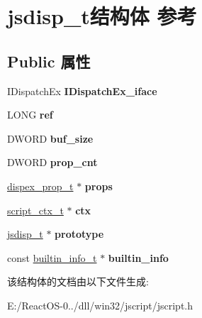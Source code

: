 \hypertarget{structjsdisp__t}{}\section{jsdisp\+\_\+t结构体 参考}
\label{structjsdisp__t}
\subsection*{Public 属性}
\begin{DoxyCompactItemize}
\item 
\mbox{\label{structjsdisp__t_a00bd6aeaaabfe1856165d92e302b3e56}} 
I\+Dispatch\+Ex {\bfseries I\+Dispatch\+Ex\+\_\+iface}
\item 
\mbox{\label{structjsdisp__t_a834448f9325aca6fa07a2470d3f0f55d}} 
L\+O\+NG {\bfseries ref}
\item 
\mbox{\label{structjsdisp__t_a6088d6e635771093b8204148f567b20c}} 
D\+W\+O\+RD {\bfseries buf\+\_\+size}
\item 
\mbox{\label{structjsdisp__t_a703718141a444ec8caf39e470956dc27}} 
D\+W\+O\+RD {\bfseries prop\+\_\+cnt}
\item 
\mbox{\label{structjsdisp__t_afc5b87ece68e4168d9fc49e2088d7d08}} 
\hyperlink{struct__dispex__prop__t}{dispex\+\_\+prop\+\_\+t} $\ast$ {\bfseries props}
\item 
\mbox{\label{structjsdisp__t_afc9d2aa2bfbea76259138fb1b1361d87}} 
\hyperlink{struct__script__ctx__t}{script\+\_\+ctx\+\_\+t} $\ast$ {\bfseries ctx}
\item 
\mbox{\label{structjsdisp__t_a644a53f92b393f3d51839668add05118}} 
\hyperlink{structjsdisp__t}{jsdisp\+\_\+t} $\ast$ {\bfseries prototype}
\item 
\mbox{\label{structjsdisp__t_a25a754e06fc2666faa74d078d147e451}} 
const \hyperlink{structbuiltin__info__t}{builtin\+\_\+info\+\_\+t} $\ast$ {\bfseries builtin\+\_\+info}
\end{DoxyCompactItemize}


该结构体的文档由以下文件生成\+:\begin{DoxyCompactItemize}
\item 
E\+:/\+React\+O\+S-\/0../dll/win32/jscript/jscript.\+h\end{DoxyCompactItemize}
